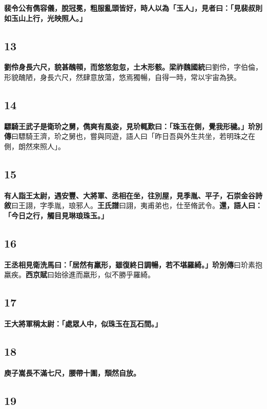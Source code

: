 \textbf{裴令公有儁容儀，脫冠冕，粗服亂頭皆好，時人以為「玉人」，見者曰：「見裴叔則如玉山上行，光映照人。」}

\subsection*{13}

\textbf{劉伶身長六尺，貌甚醜顇，而悠悠忽忽，土木形骸。}{\footnotesize \textbf{梁祚魏國統}曰劉伶，字伯倫，形貌醜陋，身長六尺，然肆意放蕩，悠焉獨暢，自得一時，常以宇宙為狹。}

\subsection*{14}

\textbf{驃騎王武子是衛玠之舅，儁爽有風姿，見玠輒歎曰：「珠玉在側，覺我形穢。」}{\footnotesize \textbf{玠別傳}曰驃騎王濟，玠之舅也，嘗與同遊，語人曰「昨日吾與外生共坐，若明珠之在側，朗然來照人」。}

\subsection*{15}

\textbf{有人詣王太尉，遇安豐、大將軍、丞相在坐，往別屋，見季胤、平子，}{\footnotesize \textbf{石崇金谷詩敘}曰王詡，字季胤，琅邪人。\textbf{王氏譜}曰詡，夷甫弟也，仕至脩武令。}\textbf{還，語人曰：「今日之行，觸目見琳琅珠玉。」}

\subsection*{16}

\textbf{王丞相見衛洗馬曰：「居然有羸形，雖復終日調暢，若不堪羅綺。」}{\footnotesize \textbf{玠別傳}曰玠素抱羸疾。\textbf{西京賦}曰始徐進而羸形，似不勝乎羅綺。}

\subsection*{17}

\textbf{王大將軍稱太尉：「處眾人中，似珠玉在瓦石間。」}

\subsection*{18}

\textbf{庾子嵩長不滿七尺，腰帶十圍，頹然自放。}

\subsection*{19}

